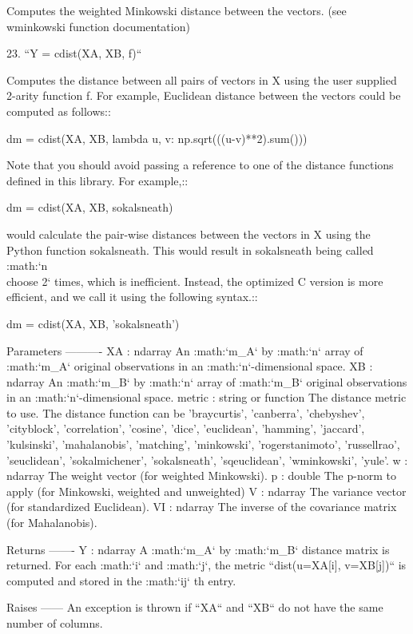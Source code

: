 \begin{DoxyVerb}
   Computes the weighted Minkowski distance between the
   vectors. (see wminkowski function documentation)

23. ``Y = cdist(XA, XB, f)``

   Computes the distance between all pairs of vectors in X
   using the user supplied 2-arity function f. For example,
   Euclidean distance between the vectors could be computed
   as follows::

     dm = cdist(XA, XB, lambda u, v: np.sqrt(((u-v)**2).sum()))

   Note that you should avoid passing a reference to one of
   the distance functions defined in this library. For example,::

     dm = cdist(XA, XB, sokalsneath)

   would calculate the pair-wise distances between the vectors in
   X using the Python function sokalsneath. This would result in
   sokalsneath being called :math:`{n \\choose 2}` times, which
   is inefficient. Instead, the optimized C version is more
   efficient, and we call it using the following syntax.::

     dm = cdist(XA, XB, 'sokalsneath')

Parameters
----------
XA : ndarray
    An :math:`m_A` by :math:`n` array of :math:`m_A`
    original observations in an :math:`n`-dimensional space.
XB : ndarray
    An :math:`m_B` by :math:`n` array of :math:`m_B`
    original observations in an :math:`n`-dimensional space.
metric : string or function
    The distance metric to use. The distance function can
    be 'braycurtis', 'canberra', 'chebyshev', 'cityblock',
    'correlation', 'cosine', 'dice', 'euclidean', 'hamming',
    'jaccard', 'kulsinski', 'mahalanobis', 'matching',
    'minkowski', 'rogerstanimoto', 'russellrao', 'seuclidean',
    'sokalmichener', 'sokalsneath', 'sqeuclidean', 'wminkowski',
    'yule'.
w : ndarray
    The weight vector (for weighted Minkowski).
p : double
    The p-norm to apply (for Minkowski, weighted and unweighted)
V : ndarray
    The variance vector (for standardized Euclidean).
VI : ndarray
    The inverse of the covariance matrix (for Mahalanobis).

Returns
-------
Y : ndarray
    A :math:`m_A` by :math:`m_B` distance matrix is returned.
    For each :math:`i` and :math:`j`, the metric
    ``dist(u=XA[i], v=XB[j])`` is computed and stored in the
    :math:`ij` th entry.

Raises
------
An exception is thrown if ``XA`` and ``XB`` do not have
the same number of columns.\end{DoxyVerb}
 \hypertarget{namespacescipy_1_1spatial_1_1distance_a7de603cc98f4334e5a9cdf6dac8c2acf}{}
